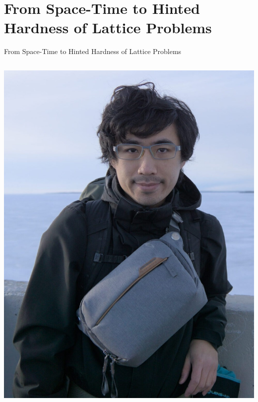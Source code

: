\documentclass[xcolor=table,10pt,aspectratio=169]{beamer}
\begin{document}
\section{From Space-Time to Hinted Hardness of Lattice Problems}
\label{sec:orgee1164a}
\begin{frame}[label={sec:org42b8277}]{From Space-Time to Hinted Hardness of Lattice Problems}
\begin{columns}
\begin{column}{0.5\columnwidth}
\begin{center}
\includegraphics[keepaspectratio,frame,height=0.6\textheight]{./russell.jpg}
\end{center}
\end{column}



\end{columns}
\end{frame}
\end{document}
